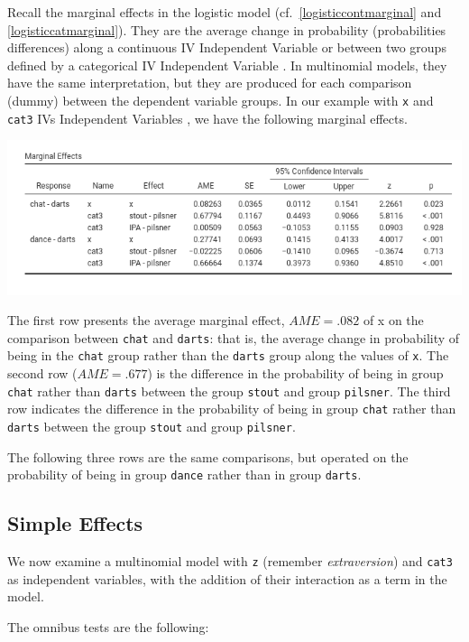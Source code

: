 \documentclass[
]{book}
\begin{document}
Recall the marginal effects in the logistic model (cf.~\ref{logisticcontmarginal} and \ref{logisticcatmarginal}). They are the average change in probability (probabilities differences) along a continuous {IV {Independent Variable} } or between two groups defined by a categorical {IV {Independent Variable} }. In multinomial models, they have the same interpretation, but they are produced for each comparison (dummy) between the dependent variable groups. In our example with \texttt{x} and \texttt{cat3} {IVs {Independent Variables} }, we have the following marginal effects.

\includegraphics{bookletpics/3_multi_output7.png}

The first row presents the average marginal effect, \(AME=.082\) of x on the comparison between \texttt{chat} and \texttt{darts}: that is, the average change in probability of being in the \texttt{chat} group rather than the \texttt{darts} group along the values of \texttt{x}. The second row (\(AME=.677\)) is the difference in the probability of being in group \texttt{chat} rather than \texttt{darts} between the group \texttt{stout} and group \texttt{pilsner}. The third row indicates the difference in the probability of being in group \texttt{chat} rather than \texttt{darts} between the group \texttt{stout} and group \texttt{pilsner}.

The following three rows are the same comparisons, but operated on the probability of being in group \texttt{dance} rather than in group \texttt{darts}.

\hypertarget{simple-effects-1}{%
\subsection{Simple Effects}\label{simple-effects-1}}

We now examine a multinomial model with \texttt{z} (remember \emph{extraversion}) and \texttt{cat3} as independent variables, with the addition of their interaction as a term in the model.

The omnibus tests are the following:
\end{document}
